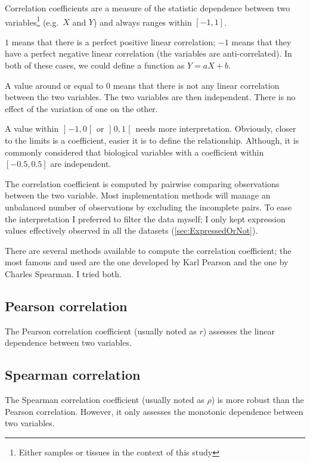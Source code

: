 
Correlation coefficients are a measure of the statistic dependence between two
variables\footnote{Either samples or tissues in the context of this study} (e.g.\
$X$ and $Y$) and always ranges within $[-1,1]$.

$1$ means that there is a perfect positive linear
correlation; $-1$ means that they have a perfect negative linear correlation (the
variables are anti-correlated). In both of these cases, we could define a function
as $Y = aX+b$.

A value around or equal to $0$ means that there is not any linear correlation between
the two variables. The two variables are then independent.
There is no effect of the variation of one on the other.

A value within $\mathopen]-1,0\mathclose[$
or $\mathopen]0,1\mathclose[$ needs more interpretation. Obviously, closer to
the limits is a coefficient, easier it is to define the relationship.
Although, it is commonly considered that biological variables with a coefficient within
$[-0.5,0.5]$ are independent.

The correlation coefficient is computed by pairwise comparing observations
between the two variable. Most implementation methods
will manage an unbalanced number of observations by excluding the incomplete pairs.
To ease the interpretation I preferred to filter the data \latin{a priori}
myself; I only kept expression values effectively observed in all the datasets
(\cref{sec:ExpressedOrNot}).

There are several methods available to compute the correlation coefficient; the
most famous and used are the one developed by Karl Pearson and the one by Charles
Spearman. I tried both.

\begin{comment}
Now, as this study is part of a broader scheme that aims to provide \latin{in fine}
a reference for the Human transcriptome (and proteome), Pearson correlation
coefficients give a better estimation on the practical feasibility.
\end{comment}

\subsection{Pearson correlation}
The Pearson correlation coefficient (usually noted as $r$) assesses the linear
dependence between two variables.

\subsection{Spearman correlation}
The Spearman correlation coefficient (usually noted as $\rho$)
is more robust than the Pearson correlation.
However, it only assesses the monotonic dependence between two variables.



